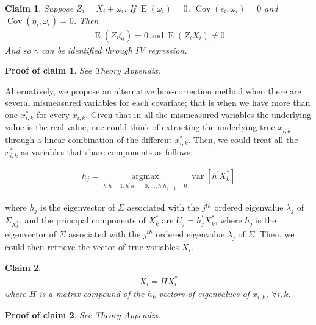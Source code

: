 \documentclass[10pt]{article}
\newtheorem{claim}{Claim}
\newtheorem{claimproof}{Proof of claim}[claim]
\begin{document}
        \begin{claim}
        Suppose $ Z_i=X_i+\omega_i$. If $\operatorname{E}(\omega_i)=0$, $\operatorname{Cov}(\epsilon_i,\omega_i)=0$ and $\operatorname{Cov}(\eta_i,\omega_i)=0$. Then
        \begin{align}
        \operatorname{E}(Z_i\zeta_i)=0 \ \text{and} \  \operatorname{E}(Z_iX_i)\neq0
        \end{align}
        And so $\gamma$ can be identified through IV regression.
        \end{claim}

        \begin{claimproof}
        See Theory Appendix.
        \end{claimproof}
        
        Alternatively, we propose an alternative bias-correction method when there are several mismeasured variables for each covariate; that is when we have more than one $x_{i,k}^*$ for every $x_{i,k}$. Given that in all the mismeasured variables the underlying value is the real value, one could think of extracting the underlying true $x_{i,k}$ through a linear combination of the different $x_{i,k}^*$. Then, we could treat all the $x_{i,k}^*$ as variables that share components as follows:

        \begin{align} \label{variance_max}
           h_{j}=\underset{h^{\prime} h=1, h^{\prime} h_{1}=0, \ldots, h^{\prime} h_{j-1}=0}{\operatorname{argmax}} \operatorname{var}\left[h^{\prime} X^*_k\right]  
        \end{align}
        
        where $h_j$ is the eigenvector of $\Sigma$ associated with the $j^{t h}$ ordered eigenvalue $\lambda_{j}$ of $\Sigma_{X^*_k}$, and the principal components of $X^*_k$ are $U_{j}=h_{j}^{\prime} X^*_k$, where $h_{j}$ is the eigenvector of $\Sigma$ associated with the $j^{t h}$ ordered eigenvalue $\lambda_{j}$ of $\Sigma$. Then, we could then retrieve the vector of true variables $X_i$.

        \begin{claim} \label{linear_combo}
            \begin{align}
                X_i=HX^*_i
            \end{align}
        where $H$ is a matrix compound of the $h_k$ vectors of eigenvalues of $x_{i,k}$, $\forall i,k$.
        \end{claim}

        \begin{claimproof}
            See Theory Appendix.
        \end{claimproof}
 
\end{document}

